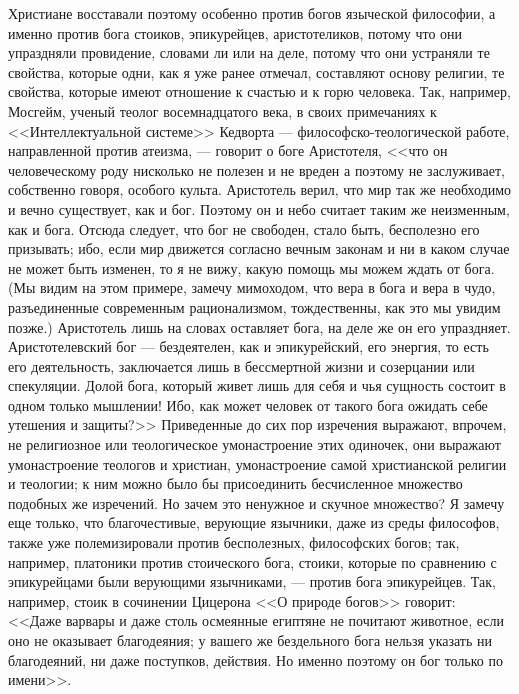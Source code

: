 \documentclass[12pt]{article}
\begin{document}
Христиане восставали поэтому особенно против богов языческой философии, а именно против бога стоиков, эпикурейцев, аристотеликов, потому что они упраздняли провидение, словами ли или на деле, потому что они устраняли те свойства, которые одни, как я уже ранее отмечал, составляют основу религии, те свойства, которые имеют отношение к счастью и к горю человека. Так, например, Мосгейм, ученый теолог восемнадцатого века, в своих примечаниях к <<Интеллектуальной системе>> Кедворта --- философско-теологической работе, направленной против атеизма, --- говорит о боге Аристотеля, <<что он человеческому роду нисколько не полезен и не вреден а поэтому не заслуживает, собственно говоря, особого культа. Аристотель верил, что мир так же необходимо и вечно существует, как и бог. Поэтому он и небо считает таким же неизменным, как и бога. Отсюда следует, что бог не свободен, стало быть, бесполезно его призывать; ибо, если мир движется согласно вечным законам и ни в каком случае не может быть изменен, то я не вижу, какую помощь мы можем ждать от бога. (Мы видим на этом примере, замечу мимоходом, что вера в бога и вера в чудо, разъединенные современным рационализмом, тождественны, как это мы увидим позже.) Аристотель лишь на словах оставляет бога, на деле же он его упраздняет. Аристотелевский бог --- бездеятелен, как и эпикурейский, его энергия, то есть его деятельность, заключается лишь в бессмертной жизни и созерцании или спекуляции. Долой бога, который живет лишь для себя и чья сущность состоит в одном только мышлении! Ибо, как может человек от такого бога ожидать себе утешения и защиты?>> Приведенные до сих пор изречения выражают, впрочем, не религиозное или теологическое умонастроение этих одиночек, они выражают умонастроение теологов и христиан, умонастроение самой христианской религии и теологии; к ним можно было бы присоединить бесчисленное множество подобных же изречений. Но зачем это ненужное и скучное множество? Я замечу еще только, что благочестивые, верующие язычники, даже из среды философов, также уже полемизировали против бесполезных, философских богов; так, например, платоники против стоического бога, стоики, которые по сравнению с эпикурейцами были верующими язычниками, --- против бога эпикурейцев. Так, например, стоик в сочинении Цицерона <<О природе богов>> говорит: <<Даже варвары и даже столь осмеянные египтяне не почитают животное, если оно не оказывает благодеяния; у вашего же бездельного бога нельзя указать ни благодеяний, ни даже поступков, действия. Но именно поэтому он бог только по имени>>. 
\end{document}

